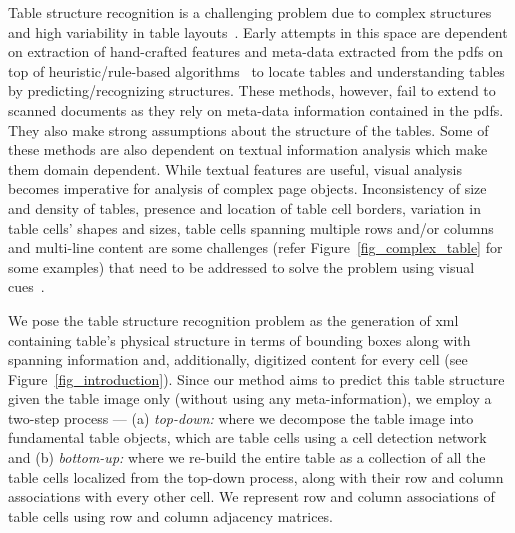 \documentclass[runningheads]{llncs}
\begin{document}
Table structure recognition is a challenging problem due to complex structures and high variability in table layouts~\cite{hu1999medium,wang2004table,nishida2017understanding,schreiber2017deepdesrt,bao2018table,qasim2019rethinking,table_splitting,li2019tablebank,paliwal2019tablenet,zhong2019image,chi2019complicated,Khan_2019,Siddiqui2019Rethinking,xue2019res2tim}. Early attempts in this space are dependent on extraction of hand-crafted features and meta-data extracted from the {\sc pdf}s on top of heuristic/rule-based algorithms~\cite{itonori1993table,green1995recognition,kieninger1998table,tupaj1996extracting} to locate tables and understanding tables by predicting/recognizing structures. These methods, however, fail to extend to scanned documents as they rely on meta-data information contained in the {\sc pdf}s. They also make strong assumptions about the structure of the tables. Some of these methods are also dependent on textual information analysis which make them domain dependent. While textual features are useful, visual analysis becomes imperative for analysis of complex page objects. Inconsistency of size and density of tables, presence and location of table cell borders, variation in table cells' shapes and sizes, table cells spanning multiple rows and/or columns and multi-line content are some challenges (refer
Figure~\ref{fig_complex_table} for some examples) that need to be addressed to solve the problem using visual cues~\cite{hu1999medium,wang2004table,itonori1993table,green1995recognition,kieninger1998table,tupaj1996extracting}. 

\begin{figure*}[t]
\begin{center}
\end{center}
\caption{Examples of complex table images from {\sc unlv} and {\sc icdar}-2013 datasets. Complex tables are ones which contain partial or no ruling lines, multi-row/column spanning cells, multi-line content, many empty dense cells.} \label{fig_complex_table}
\end{figure*}

We pose the table structure recognition problem as the generation of {\sc xml} containing table's physical structure in terms of bounding boxes along with spanning information and, additionally, digitized content for every cell (see Figure~\ref{fig_introduction}). Since our method aims to predict this table structure given the table image only (without using any meta-information), we employ a two-step process --- (a) \textit{top-down:} where we decompose the table image into fundamental table objects, which are table cells using a cell detection network and (b) \textit{bottom-up:} where we re-build the entire table as a collection of all the table cells localized from the top-down process, along with their row and column associations with every other cell. We represent row and column associations of table cells using row and column adjacency matrices.
\end{document}
